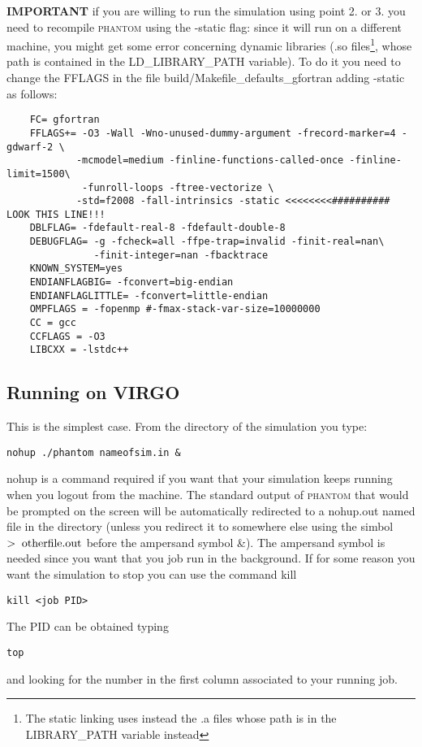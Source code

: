 \documentclass[10pt,a4paper,twoside]{article} %
\begin{document}
\textbf{IMPORTANT} if you are willing to run the simulation using point 2. or 3. you need to recompile \textsc{phantom} using the -static flag: since it will run on a different machine, you might get some error concerning dynamic libraries (.so files\footnote{The static linking uses instead the .a files whose path is in the LIBRARY\_PATH variable instead}, whose path is contained in the LD\_LIBRARY\_PATH variable). To do it you need to change the FFLAGS in the file build/Makefile\_defaults\_gfortran adding -static as follows:

\begin{verbatim}
    FC= gfortran
    FFLAGS+= -O3 -Wall -Wno-unused-dummy-argument -frecord-marker=4 -gdwarf-2 \
            -mcmodel=medium -finline-functions-called-once -finline-limit=1500\
             -funroll-loops -ftree-vectorize \
            -std=f2008 -fall-intrinsics -static <<<<<<<<########## LOOK THIS LINE!!!
    DBLFLAG= -fdefault-real-8 -fdefault-double-8
    DEBUGFLAG= -g -fcheck=all -ffpe-trap=invalid -finit-real=nan\
               -finit-integer=nan -fbacktrace
    KNOWN_SYSTEM=yes
    ENDIANFLAGBIG= -fconvert=big-endian
    ENDIANFLAGLITTLE= -fconvert=little-endian
    OMPFLAGS = -fopenmp #-fmax-stack-var-size=10000000
    CC = gcc
    CCFLAGS = -O3
    LIBCXX = -lstdc++
\end{verbatim}

\subsection{Running on VIRGO}

This is the simplest case. From the directory of the simulation you type:
\begin{verbatim}
nohup ./phantom nameofsim.in &
\end{verbatim}
nohup is a command required if you want that your simulation keeps running when you logout from the machine. The standard output of \textsc{phantom} that would be prompted on the screen will be automatically redirected to a nohup.out named file in the directory (unless you redirect it to somewhere else using the simbol $>\; {\rm otherfile.out}$ before the ampersand symbol \&). The ampersand symbol is needed since you want that you job run in the background.
If for some reason you want the simulation to stop you can use the command kill
\begin{verbatim}
kill <job PID>
\end{verbatim}
The PID can be obtained typing
\begin{verbatim}
top
\end{verbatim}
and looking for the number in the first column associated to your running job.
\end{document}
